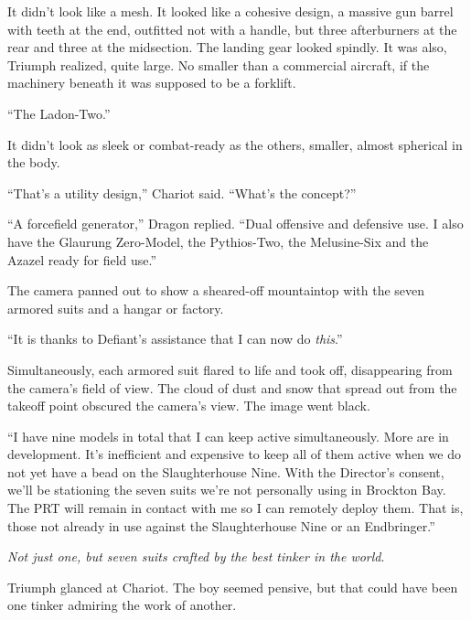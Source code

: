 It didn't look like a mesh.  It looked like a cohesive design, a massive gun barrel with teeth at the end, outfitted not with a handle, but three afterburners at the rear and three at the midsection.  The landing gear looked spindly.  It was also, Triumph realized, quite large.  No smaller than a commercial aircraft, if the machinery beneath it was supposed to be a forklift.



``The Ladon-Two.''



It didn't look as sleek or combat-ready as the others, smaller, almost spherical in the body.



``That's a utility design,'' Chariot said.  ``What's the concept?''



``A forcefield generator,'' Dragon replied.  ``Dual offensive and defensive use.  I also have the Glaurung Zero-Model, the Pythios-Two, the Melusine-Six and the Azazel ready for field use.''



The camera panned out to show a sheared-off mountaintop with the seven armored suits and a hangar or factory.



``It is thanks to Defiant's assistance that I can now do \emph{this}.''



Simultaneously, each armored suit flared to life and took off, disappearing from the camera's field of view.  The cloud of dust and snow that spread out from the takeoff point obscured the camera's view.  The image went black.



``I have nine models in total that I can keep active simultaneously.  More are in development.  It's inefficient and expensive to keep all of them active when we do not yet have a bead on the Slaughterhouse Nine.  With the Director's consent, we'll be stationing the seven suits we're not personally using in Brockton Bay.  The PRT will remain in contact with me so I can remotely deploy them.  That is, those not already in use against the Slaughterhouse Nine or an Endbringer.''



\emph{Not just one, but seven suits crafted by the best tinker in the world}.



Triumph glanced at Chariot.  The boy seemed pensive, but that could have been one tinker admiring the work of another.



